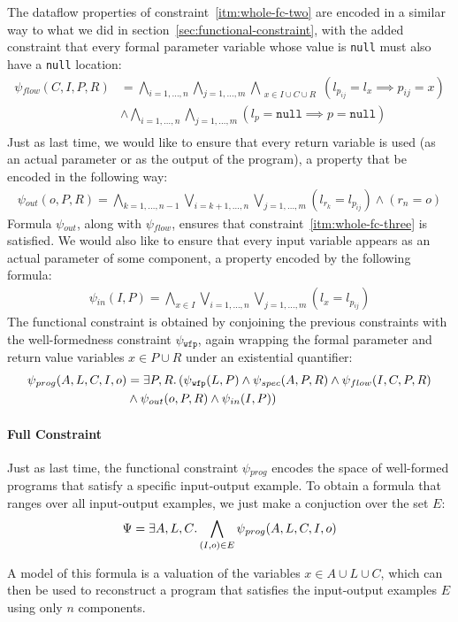 The dataflow properties of constraint~\ref{itm:whole-fc-two} are encoded in a
similar way to what we did in section~\ref{sec:functional-constraint}, with the
added constraint that every formal parameter variable whose value is
\lstinline{null} must also have a \lstinline{null} location:
%
\begin{align*}
  \psi{}_{flow}(C,I,P,R)
  &=\bigwedge_{i=1,\ldots,n}
    \bigwedge_{j=1,\ldots,m}
    \bigwedge_{\substack{x \in I \cup C \cup R}}
    (l_{p_{ij}} = l_x \implies p_{ij} = x) \\
  &\wedge\bigwedge_{i=1,\ldots,n}
    \bigwedge_{j=1,\ldots,m}
    (l_p = \mathtt{null} \implies p = \mathtt{null}) \\
\end{align*}
%
\noindent
Just as last time, we would like to ensure that every return variable is used
(as an actual parameter or as the output of the program), a property that be
encoded in the following way:
%
\begin{align*}
  \psi{}_{out}(o, P, R)
  =\bigwedge_{k=1,\ldots,n-1}
    \bigvee_{i=k+1,\ldots,n}
    \bigvee_{j=1,\ldots,m}
    (l_{r_k} = l_{p_{ij}})
  \wedge (r_n = o)
\end{align*}
%
\noindent
Formula $\psi{}_{out}$, along with $\psi{}_{flow}$, ensures that
constraint~\ref{itm:whole-fc-three} is satisfied.
We would also like to ensure that every input variable appears as an actual
parameter of some component, a property encoded by the following formula:
%
\begin{align*}
  \psi{}_{in}(I, P)
  =\bigwedge_{x \in I}
    \bigvee_{i=1,\ldots,n}
    \bigvee_{j=1,\ldots,m}
    (l_{x} = l_{p_{ij}})
\end{align*}
%
The functional constraint is obtained by conjoining the previous constraints
with the well-formedness constraint $\psi{}_{\mathtt{wfp}}$,
again wrapping the formal parameter and return value variables $x \in P \cup R$
under an existential quantifier:
%
\begin{align*}
  \psi{}_{prog}(A,L,C,I,o) &= \exists P,R\ldotp
  (\psi{}_{\mathtt{wfp}}(L, P) \wedge
  \psi{}_{spec}(A, P, R) \wedge
  \psi{}_{flow}(I, C, P, R)\\&\wedge 
  \psi{}_{out}(o, P, R) \wedge
  \psi{}_{in}(I, P))
\end{align*}

\paragraph{Full Constraint}
\label{sec:whole-full-constraint}

Just as last time, the functional constraint $\psi{}_{prog}$ encodes the space
of well-formed programs that satisfy a specific input-output example.
To obtain a formula that ranges over all input-output examples, we just make a
conjuction over the set $E$:
%
\[
  \Psi{}=\exists{A,L,C}\ldotp\bigwedge_{(I, o) \in E}\psi{}_{prog}(A,L,C,I,o)
\]

A model of this formula is a valuation of the variables $x \in A \cup L \cup C$,
which can then be used to reconstruct a program that satisfies the input-output
examples $E$ using only $n$ components.
